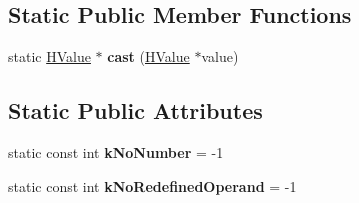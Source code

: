 \subsection*{Static Public Member Functions}
\begin{DoxyCompactItemize}
\item 
static \hyperlink{classv8_1_1internal_1_1_h_value}{H\+Value} $\ast$ {\bfseries cast} (\hyperlink{classv8_1_1internal_1_1_h_value}{H\+Value} $\ast$value)\hypertarget{classv8_1_1internal_1_1_h_value_a02515139f93e2d36d78e3df91486dd20}{}\label{classv8_1_1internal_1_1_h_value_a02515139f93e2d36d78e3df91486dd20}

\end{DoxyCompactItemize}
\subsection*{Static Public Attributes}
\begin{DoxyCompactItemize}
\item 
static const int {\bfseries k\+No\+Number} = -\/1\hypertarget{classv8_1_1internal_1_1_h_value_aa214d3303d177f1cade823cce1ad8e69}{}\label{classv8_1_1internal_1_1_h_value_aa214d3303d177f1cade823cce1ad8e69}

\item 
static const int {\bfseries k\+No\+Redefined\+Operand} = -\/1\hypertarget{classv8_1_1internal_1_1_h_value_a06b0ac46b10987c3b19a99211c61c355}{}\label{classv8_1_1internal_1_1_h_value_a06b0ac46b10987c3b19a99211c61c355}

\end{DoxyCompactItemize}
